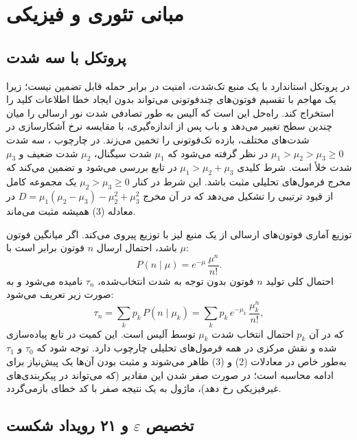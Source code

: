 \section{مبانی تئوری و فیزیکی}

\subsection{پروتکل  با سه شدت}

در پروتکل استاندارد  با یک منبع تک‌شدت، امنیت در برابر حمله  قابل تضمین نیست؛ زیرا یک مهاجم با تقسیم فوتون‌های چندفوتونی می‌تواند بدون ایجاد خطا اطلاعات کلید را استخراج کند. راه‌حل  این است که آلیس به طور تصادفی شدت نور ارسالی را میان چندین سطح تغییر می‌دهد و باب پس از اندازه‌گیری، با مقایسه نرخ آشکارسازی در شدت‌های مختلف، بازده تک‌فوتونی را تخمین می‌زند. در چارچوب ، سه شدت $\mu_1 > \mu_2 > \mu_3 \ge 0$ در نظر گرفته می‌شود که $\mu_1$ شدت سیگنال، $\mu_2$ شدت  ضعیف و $\mu_3$ شدت خلأ است. شرط کلیدی $\mu_1 > \mu_2 + \mu_3$ در تابع  بررسی می‌شود و تضمین می‌کند که مخرج فرمول‌های تحلیلی مثبت باشد. این شرط در کنار $\mu_2 > \mu_3 \ge 0$ یک مجموعه کامل از قیود ترتیبی را تشکیل می‌دهد که در آن مخرج $D = \mu_1(\mu_2 - \mu_3) - \mu_2^2 + \mu_3^2$ در معادله (3) همیشه مثبت می‌ماند.

توزیع آماری فوتون‌های ارسالی از یک منبع لیز با توزیع  پیروی می‌کند. اگر میانگین فوتون $\mu$ باشد، احتمال ارسال $n$ فوتون برابر است با:
\begin{equation}
	P(n \mid \mu) = e^{-\mu}\,\frac{\mu^n}{n!}.
\end{equation}
احتمال کلی تولید $n$ فوتون بدون توجه به شدت انتخاب‌شده، $\tau_n$ نامیده می‌شود و به صورت زیر تعریف می‌شود:
\begin{equation}
	\tau_n = \sum_k p_k\,P(n \mid \mu_k) = \sum_k p_k\,e^{-\mu_k}\,\frac{\mu_k^n}{n!},
\end{equation}
که در آن $p_k$ احتمال انتخاب شدت $\mu_k$ توسط آلیس است. این کمیت در تابع  پیاده‌سازی شده و نقش مرکزی در همه فرمول‌های تحلیلی چارچوب دارد. توجه شود که $\tau_0$ و $\tau_1$ به‌طور خاص در معادلات (2) و (3) ظاهر می‌شوند و مثبت بودن آن‌ها یک پیش‌نیاز برای ادامه محاسبه است؛ در صورت صفر شدن این مقادیر (که می‌تواند در پیکربندی‌های غیرفیزیکی رخ دهد)، ماژول به یک نتیجه صفر با کد خطای  بازمی‌گردد.

\subsection{تخصیص \texorpdfstring{$\varepsilon$}{epsilon} و ۲۱ رویداد شکست}

